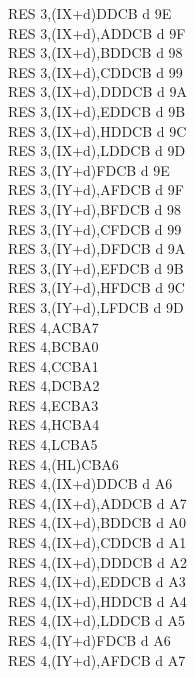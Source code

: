 \begin{multicols}{3}
{\begin{tabbing}
        RES 3,(IX+d)\>DDCB d 9E\\
        RES 3,(IX+d),A\UNDOC\>DDCB d 9F\\
        RES 3,(IX+d),B\UNDOC\>DDCB d 98\\
        RES 3,(IX+d),C\UNDOC\>DDCB d 99\\
        RES 3,(IX+d),D\UNDOC\>DDCB d 9A\\
        RES 3,(IX+d),E\UNDOC\>DDCB d 9B\\
        RES 3,(IX+d),H\UNDOC\>DDCB d 9C\\
        RES 3,(IX+d),L\UNDOC\>DDCB d 9D\\
        RES 3,(IY+d)\>FDCB d 9E\\
        RES 3,(IY+d),A\UNDOC\>FDCB d 9F\\
        RES 3,(IY+d),B\UNDOC\>FDCB d 98\\
        RES 3,(IY+d),C\UNDOC\>FDCB d 99\\
        RES 3,(IY+d),D\UNDOC\>FDCB d 9A\\
        RES 3,(IY+d),E\UNDOC\>FDCB d 9B\\
        RES 3,(IY+d),H\UNDOC\>FDCB d 9C\\
        RES 3,(IY+d),L\UNDOC\>FDCB d 9D\\
        RES 4,A\>CBA7\\
        RES 4,B\>CBA0\\
        RES 4,C\>CBA1\\
        RES 4,D\>CBA2\\
        RES 4,E\>CBA3\\
        RES 4,H\>CBA4\\
        RES 4,L\>CBA5\\
        RES 4,(HL)\>CBA6\\
        RES 4,(IX+d)\>DDCB d A6\\
        RES 4,(IX+d),A\UNDOC\>DDCB d A7\\
        RES 4,(IX+d),B\UNDOC\>DDCB d A0\\
        RES 4,(IX+d),C\UNDOC\>DDCB d A1\\
        RES 4,(IX+d),D\UNDOC\>DDCB d A2\\
        RES 4,(IX+d),E\UNDOC\>DDCB d A3\\
        RES 4,(IX+d),H\UNDOC\>DDCB d A4\\
        RES 4,(IX+d),L\UNDOC\>DDCB d A5\\
        RES 4,(IY+d)\>FDCB d A6\\
        RES 4,(IY+d),A\UNDOC\>FDCB d A7\\

\end{tabbing}}
\end{multicols}

